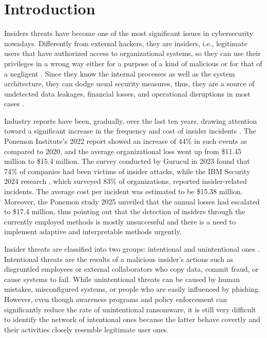 \chapter{Introduction}

Insiders threats have become one of the most significant issues in cybersecurity nowadays. Differently from external hackers, they are insiders, i.e., legitimate users that have authorized access to organizational systems, so they can use their privileges in a wrong way either for a purpose of a kind of malicious or for that of a negligent \cite{bishop2008defining}. Since they know the internal processes as well as the system architecture, they can dodge usual security measures, thus, they are a source of undetected data leakages, financial losses, and operational disruptions in most cases \cite{inayat2024insider}.

Industry reports have been, gradually, over the last ten years, drawing attention toward a significant increase in the frequency and cost of insider incidents \cite{worth2025databreach}. The Ponemon Institute’s 2022 report \cite{Ref3} showed an increase of 44\% in such events as compared to 2020, and the average organizational loss went up from \$11.45 million to \$15.4 million. The survey conducted by Gurucul in 2023 \cite{gurucul2024motivationalmisuse} found that 74\% of companies had been victims of insider attacks, while the IBM Security 2024 research \cite{IBM_2024}, which surveyed 83\% of organizations, reported insider-related incidents. The average cost per incident was estimated to be \$15.38 million. Moreover, the Ponemon study 2025 \cite{dtex2025insiderrisks,verizon2025dbir-emea} unveiled that the annual losses had escalated to \$17.4 million, thus pointing out that the detection of insiders through the currently employed methods is mostly unsuccessful and there is a need to implement adaptive and interpretable methods urgently.

Insider threats are classified into two groups: intentional and unintentional ones \cite{hunker2011insiders}. Intentional threats are the results of a malicious insider’s actions such as disgruntled employees or external collaborators who copy data, commit fraud, or cause systems to fail. While unintentional threats can be caused by human mistakes, misconfigured systems, or people who are easily influenced by phishing. However, even though awareness programs and policy enforcement can significantly reduce the rate of unintentional ransomware, it is still very difficult to identify the network of intentional ones because the latter behave covertly and their activities closely resemble legitimate user ones.

